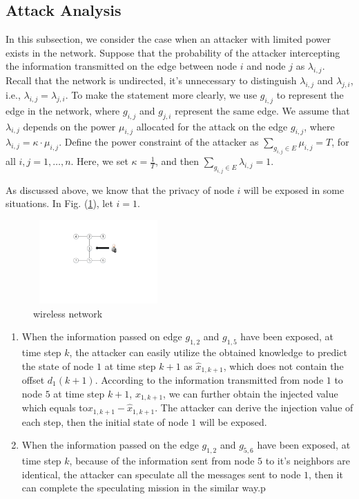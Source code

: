 \documentclass[10pt,journal,compsoc]{IEEEtran}
\begin{document}
\subsection{Attack Analysis}\label{subsection: attack analysis}
In this subsection, we consider the case when an attacker with limited power exists in the network. Suppose that the probability of the attacker intercepting the information transmitted on the edge between node $i$ and node $j$ as $\lambda_{i, j}$. Recall that the network is undirected, it's unnecessary to distinguish $\lambda_{i, j}$ and $\lambda_{j, i}$, i.e., $\lambda_{i,j}=\lambda_{j,i}$. To make the statement more clearly, we use $g_{i, j}$ to represent the edge in the network, where $g_{i,j}$ and $g_{j,i}$ represent the same edge. We assume that $\lambda_{i, j}$ depends on the power $\mu_{i, j}$ allocated for the attack on the edge $g_{i, j}$, where $\lambda_{i, j}=\kappa \cdot \mu_{i, j}$. Define the power constraint of the attacker as $\sum_{g_{i,j}\in E}\mu_{i, j}=T$, for all $i, j=1,\ldots,n$. Here, we set $\kappa=\frac{1}{T}$, and then $\sum_{g_{i,j}\in E}\lambda_{i, j}=1$.

As discussed above, we know that the privacy of node $i$ will be exposed in some situations. In Fig. (\ref{fig1}), let $i=1$.

\begin{figure}[!htb] \label{wireless network}
 \centering
 \includegraphics[width=5cm, height=3.2cm]{AttackNetwork}
 \caption{wireless network}
 \label{fig1}
\end{figure}

\begin{enumerate}[1)]
\item When the information passed on edge $g_{1, 2}$ and $g_{1, 5}$ have been exposed, at time step $k$, the attacker can easily utilize the obtained knowledge to predict the state of node $1$ at time step $k+1$ as $\hat{x}_{1, k+1}$, which does not contain the offset $d_{1}(k+1)$.  According to the information transmitted from node $1$ to node $5$ at time step $k+1$, $x_{1, k+1}$, we can further obtain the injected value which equals to$x_{1, k+1}-\hat{x}_{1, k+1}$. The attacker can derive the injection value of each step, then the initial state of node $1$ will be exposed.
\item When the information passed on the edge $g_{1, 2}$ and $g_{5, 6}$ have been exposed, at time step $k$, because of the information sent from node $5$ to it's neighbors are identical, the attacker can speculate all the messages sent to node $1$, then it can complete the speculating mission in the similar way.p
\end{enumerate}
\end{document}
